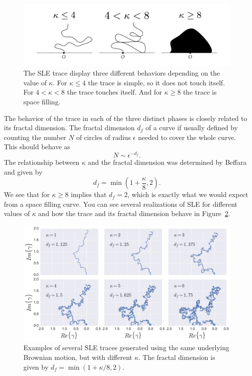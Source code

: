 \begin{figure}[t]
\begin{center}
    \includegraphics[width=1.1\textwidth]{chapters/ch4-sle/figs/kappa}
\end{center}
\caption{The SLE trace display three different behaviors depending on the value
    of $\kappa$. For $\kappa\leq4$ the trace is simple, so it does not touch
    itself. For $4<\kappa<8$ the trace touches itself. And for $\kappa\geq8$
    the trace is space filling.}
\label{fig:kappa}
\end{figure}


The behavior of the trace in each of the three distinct phases is closely
related to its fractal dimension. The fractal dimension $d_f$ of a curve if
usually defined by counting the number $N$ of circles of radius $\epsilon$
needed to cover the whole curve. This should behave as~\cite{Mandelbrot1983}
\begin{equation}
    N\sim \epsilon^{-d_f}.
\end{equation}
The relationship between $\kappa$ and the fractal dimension was determined by
Beffara~\cite{Beffara2008} and given by
\begin{equation}
    d_f=\min\left(1+\frac{\kappa}{8},2\right).
\end{equation}
We see that for $\kappa\geq 8$ implies that $d_f=2$, which is exactly what we
would expect from a space filling curve. You can see several realizations of
SLE for different values of $\kappa$ and how the trace and its fractal
dimension behave in Figure~\ref{fig:slefracdim}.

\begin{figure}[t]
\begin{center}
    \includegraphics[width=\textwidth]{chapters/ch4-sle/figs/slefracdim}
\end{center}
\caption{Examples of several SLE traces generated using the same underlying
    Brownian motion, but with different $\kappa$. The fractal dimension is
    given by $d_f=\min(1+\kappa/8, 2)$.}
\label{fig:slefracdim}
\end{figure}



